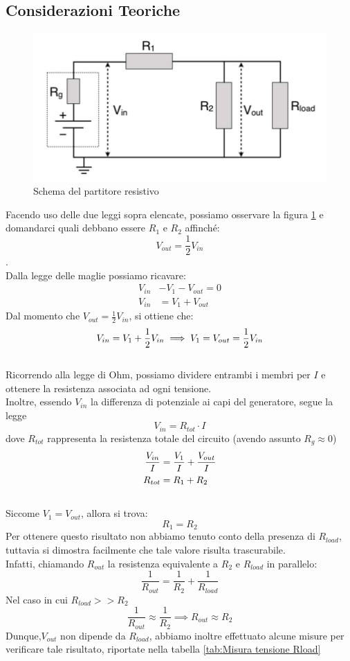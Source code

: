 \documentclass[letterpaper,12pt]{article}
\begin{document}
\subsection{Considerazioni Teoriche}
\begin{figure}
    \centering
    \includegraphics[width=.7\textwidth]{partitore_resistivo.png}
    \caption{Schema del partitore resistivo}
    \label{fig:partitore resistivo}
\end{figure}

Facendo uso delle due leggi sopra elencate, possiamo osservare la figura \ref{fig:partitore resistivo} e domandarci quali debbano essere $R_1 \text{ e } R_2$ affinché: $$V_{out} = \frac{1}{2}V_{in}$$.\\
Dalla legge delle maglie possiamo ricavare:
\begin{align*}
    V_{in} &- V_1 - V_{out} = 0 \\
    V_{in} &= V_1 + V_{out}
\end{align*}
Dal momento che $V_{out} = \frac{1}{2}V_{in}$, si ottiene che:
$$
    V_{in} = V_1 + \frac{1}{2}V_{in} \implies V_1 = V_{out} = \frac{1}{2}V_{in} \\
$$\\
Ricorrendo alla legge di Ohm, possiamo dividere entrambi i membri per $I$ e ottenere la resistenza associata ad ogni tensione.\\
Inoltre, essendo $V_{in}$ la differenza di potenziale ai capi del generatore, segue la legge $$V_{in} = R_{tot} \cdot I$$ 
dove $R_{tot}$ rappresenta la resistenza totale del circuito (avendo assunto $R_g \approx 0$)
\begin{align*}
    \frac{V_{in}}{I} &= \frac{V_1}{I} + \frac{V_{out}}{I}\\
    \vspace{10pt}
    R_{tot} &= R_1 + R_2
\end{align*} \\
Siccome $V_1 = V_{out}$, allora si trova:
$$R_1 = R_2$$
Per ottenere questo risultato non abbiamo tenuto conto della presenza di $R_{load}$, tuttavia si dimostra facilmente che tale valore risulta trascurabile.\\
Infatti, chiamando $R_{out}$ la resistenza equivalente a $R_2$ e $R_{load}$ in parallelo:
$$
\frac{1}{R_{out}} = \frac{1}{R_2} + \frac{1}{R_{load}}
$$
Nel caso in cui $R_{load} >> R_2$
$$
\frac{1}{R_{out}} \approx \frac{1}{R_2} \implies R_{out} \approx R_2
$$
Dunque,$V_{out}$ non dipende da $R_{load}$, abbiamo inoltre effettuato alcune misure per verificare tale risultato, riportate nella tabella \ref{tab:Misura tensione Rload}
\end{document}
